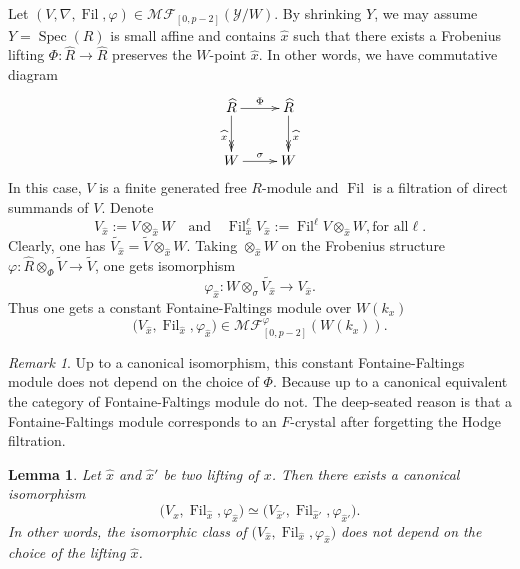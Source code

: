 \documentclass[12pt,twoside]{book}
\theoremstyle{plain}
\newtheorem{lemma}[lemma]{Lemma}
\theoremstyle{definition}
\theoremstyle{remark}
\newtheorem{remark}[remark]{Remark}
\newcommand{\mY}{{\mathcal Y}}
\DeclareMathOperator\Fil{Fil}
\DeclareMathOperator\Spec{Spec}
\newcommand{\MF}{\mathcal{MF}}
\numberwithin{equation}{section}
\begin{document}
Let $(V,\nabla,\Fil,\varphi) \in \MF_{[0,p-2]}(\mY/W)$. By shrinking $Y$, we may assume $Y = \Spec(R)$ is small affine and contains $\widehat{x}$ such that there exists a Frobenius lifting $\Phi\colon \widehat{R}\rightarrow \widehat{R}$ preserves the $W$-point $\widehat{x}$. In other words, we have commutative diagram
\begin{equation*}
\xymatrix{
\widehat{R} \ar[r]^\Phi \ar@{->>}[d]_{\widehat{x}} & \widehat{R} \ar@{->>}[d]^{\widehat{x}} \\
W \ar[r]^{\sigma} & W \\
}
\end{equation*}
In this case, $V$ is a finite generated free $R$-module and $\Fil$ is a filtration of direct summands of $V$. Denote
\[V_{\widehat{x}}:= V \otimes_{\widehat{x}} W \quad\text{and}\quad \Fil_{\widehat{x}}^\ell V_{\widehat{x}}:= \Fil^\ell V \otimes_{\widehat{x}} W,\text{for all} \ell.\]
Clearly, one has $\widetilde{V_{\widehat{x}}} = \widetilde{V} \otimes_{\widehat{x}} W$. Taking $\otimes_{\widehat{x}} W$ on the Frobenius structure $\varphi\colon \widehat{R}\otimes_\Phi \widetilde{V} \rightarrow \widetilde{V}$, one gets isomorphism
\[\varphi_{\widehat{x}} \colon W\otimes_\sigma \widetilde{V_{\widehat{x}}} \rightarrow V_{\widehat{x}}.\]
Thus one gets a constant Fontaine-Faltings module over $W(k_x)$
\[\Big(V_{\widehat{x}},\Fil_{\widehat{x}},\varphi_{\widehat{x}}\Big) \in \MF_{[0,p-2]}^{\varphi}(W(k_x)).\]

\begin{remark}
Up to a canonical isomorphism, this constant Fontaine-Faltings module does not depend on the choice of $\Phi$. Because up to a canonical equivalent the category of Fontaine-Faltings module do not. The deep-seated reason is that a Fontaine-Faltings module corresponds to an $F$-crystal after forgetting the Hodge filtration.
\end{remark}

\begin{lemma} Let $\widehat{x}$ and $\widehat{x}'$ be two lifting of $x$. Then there exists a canonical isomorphism
\[\Big(V_{\widehat{x}},\Fil_{\widehat{x}},\varphi_{\widehat{x}}\Big) \simeq \Big(V_{\widehat{x}'},\Fil_{\widehat{x}'},\varphi_{\widehat{x}'}\Big).\]
In other words, the isomorphic class of $\Big(V_{\widehat{x}},\Fil_{\widehat{x}},\varphi_{\widehat{x}}\Big)$ does not depend on the choice of the lifting $\widehat{x}$.
\end{lemma}
\end{document}
